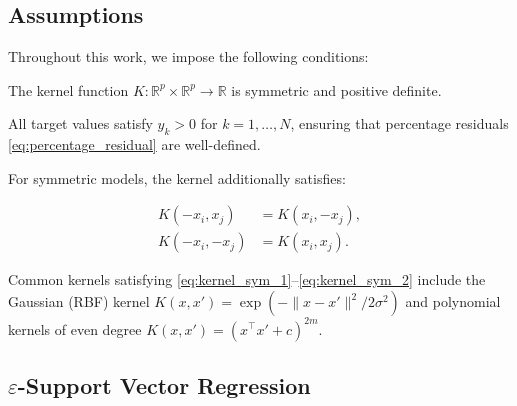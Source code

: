 \documentclass[mathematics,article,submit,pdftex,moreauthors]{Definitions/mdpi}
\begin{document}
\subsection{Assumptions}\label{subsec:assumptions}

Throughout this work, we impose the following conditions:

\begin{Assumption}\label{ass:kernel_pd}
The kernel function $K: \mathbb{R}^p \times \mathbb{R}^p \to \mathbb{R}$ is symmetric and positive definite.
\end{Assumption}

\begin{Assumption}\label{ass:positive_targets}
All target values satisfy $y_k > 0$ for $k = 1, \ldots, N$, ensuring that percentage residuals \eqref{eq:percentage_residual} are well-defined.
\end{Assumption}

\begin{Assumption}\label{ass:kernel_sym}
For symmetric models, the kernel additionally satisfies:
\begin{linenomath}
\begin{align}
K(-x_i, x_j) &= K(x_i, -x_j), \label{eq:kernel_sym_1}\\
K(-x_i, -x_j) &= K(x_i, x_j). \label{eq:kernel_sym_2}
\end{align}
\end{linenomath}
\end{Assumption}

\begin{Remark}\label{rem:kernel_examples}
Common kernels satisfying \eqref{eq:kernel_sym_1}--\eqref{eq:kernel_sym_2} include the Gaussian (RBF) kernel 
$K(x,x') = \exp(-\|x-x'\|^2/2\sigma^2)$ and polynomial kernels of even degree 
$K(x,x') = (x^\top x' + c)^{2m}$.
\end{Remark}


\subsection{$\varepsilon$-Support Vector Regression}\label{subsec:eps_classical}
\end{document}
